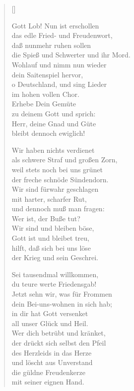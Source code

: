 \begin{multicols}{2}
\settowidth{\versewidth}{die Spieß und Schwerter und ihr Mord.}
\begin{verse}[\versewidth]


 Gott Lob! Nun ist erschollen\\
das edle Fried- und Freudenwort,\\
daß nunmehr ruhen sollen\\
die Spieß und Schwerter und ihr Mord.\\
Wohlauf und nimm nun wieder\\
dein Saitenspiel hervor,\\
o Deutschland, und sing Lieder\\
im hohen vollen Chor.\\
Erhebe Dein Gemüte\\
zu deinem Gott und sprich:\\
Herr, deine Gnad und Güte\\
bleibt dennoch ewiglich!

 Wir haben nichts verdienet\\
als schwere Straf und großen Zorn,\\
weil stets noch bei uns grünet\\
der freche schnöde Sündendorn.\\
Wir sind fürwahr geschlagen\\
mit harter, scharfer Rut,\\
und dennoch muß man fragen:\\
Wer ist, der Buße tut?\\
Wir sind und bleiben böse,\\
Gott ist und bleibet treu,\\
hilft, daß sich bei uns löse\\
der Krieg und sein Geschrei.

 Sei tausendmal willkommen,\\
du teure werte Friedensgab!\\
Jetzt sehn wir, was für Frommen\\
dein Bei-uns-wohnen in sich hab;\\
in dir hat Gott versenket\\
all unser Glück und Heil.\\
Wer dich betrübt und kränket,\\
der drückt sich selbst den Pfeil\\
des Herzleids in das Herze\\
und löscht aus Unverstand\\
die güldne Freudenkerze\\
mit seiner eignen Hand.


\end{verse}
\end{multicols}
